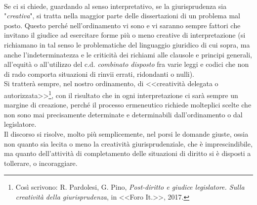 \\Se ci si chiede, guardando al senso interpretativo, se la giurisprudenza sia "\textit{creativa}", si tratta nella maggior parte delle dissertazioni di un problema mal posto.
Questo perché nell'ordinamento vi sono e vi saranno sempre fattori che invitano il giudice ad esercitare forme più o meno creative di interpretazione (si richiamano in tal senso le problematiche del linguaggio giuridico di cui sopra, ma anche l'indeterminatezza e le criticità dei richiami alle clausole e principi generali, all'equità o all'utilizzo del c.d. \textit{combinato disposto} fra varie leggi e codici che non di rado comporta situazioni di rinvii errati, ridondanti o nulli).
\\Si tratterà sempre, nel nostro ordinamento, di <<creatività delegata o autorizzata>>\footnote{Così scrivono: R. Pardolesi, G. Pino, \textit{Post-diritto e giudice legislatore. Sulla creatività della giurisprudenza}, in <<Foro It.>>, 2017.}, con il risultato che in ogni interpretazione ci sarà sempre un margine di creazione, perché il processo ermeneutico richiede molteplici scelte che non sono mai precisamente determinate e determinabili dall'ordinamento o dal legislatore.
\\Il discorso si risolve, molto più semplicemente, nel porsi le domande giuste, ossia non quanto sia lecita o meno la creatività giurisprudenziale, che è imprescindibile, ma quanto dell'attività di completamento delle situazioni di diritto si è disposti a tollerare, o incoraggiare.